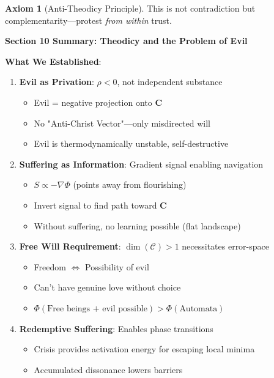 \documentclass[11pt,a4paper]{article}
\theoremstyle{definition}
\newtheorem{axiom}{Axiom}[section]
\theoremstyle{remark}
\newcommand{\CC}{\mathcal{C}}
\begin{document}
\begin{small}
\begin{enumerate}
\begin{axiom}[Anti-Theodicy Principle]
This is not contradiction but complementarity—protest \textit{from within} trust.
\end{axiom}

\begin{mdframed}[backgroundcolor=green!10,linewidth=2pt,linecolor=green!70!black]
\textbf{Section 10 Summary: Theodicy and the Problem of Evil}

\textbf{What We Established}:
\begin{enumerate}[nosep]
    \item \textbf{Evil as Privation}: \(\rho < 0\), not independent substance
        \begin{itemize}[nosep]
            \item Evil = negative projection onto \(\mathbf{C}\)
            \item No "Anti-Christ Vector"—only misdirected will
            \item Evil is thermodynamically unstable, self-destructive
        \end{itemize}
    \item \textbf{Suffering as Information}: Gradient signal enabling navigation
        \begin{itemize}[nosep]
            \item \(S \propto -\nabla \Phi\) (points away from flourishing)
            \item Invert signal to find path toward \(\mathbf{C}\)
            \item Without suffering, no learning possible (flat landscape)
        \end{itemize}
    \item \textbf{Free Will Requirement}: \(\dim(\CC) > 1\) necessitates error-space
        \begin{itemize}[nosep]
            \item Freedom \(\iff\) Possibility of evil
            \item Can't have genuine love without choice
            \item \(\Phi(\text{Free beings + evil possible}) > \Phi(\text{Automata})\)
        \end{itemize}
    \item \textbf{Redemptive Suffering}: Enables phase transitions
        \begin{itemize}[nosep]
            \item Crisis provides activation energy for escaping local minima
            \item Accumulated dissonance lowers barriers

\end{itemize}
\end{enumerate}
\end{mdframed}
\end{enumerate}
\end{small}
\end{document}
